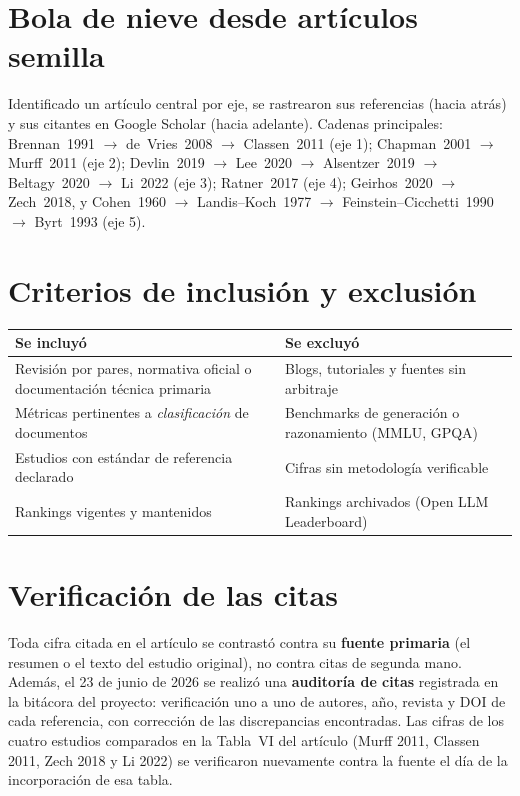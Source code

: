 \documentclass[11pt,a4paper]{article}
\begin{document}
\section{Bola de nieve desde artículos semilla}

Identificado un artículo central por eje, se rastrearon sus referencias
(hacia atrás) y sus citantes en Google Scholar (hacia adelante). Cadenas
principales: Brennan~1991 $\rightarrow$ de~Vries~2008 $\rightarrow$
Classen~2011 (eje 1); Chapman~2001 $\rightarrow$ Murff~2011 (eje 2);
Devlin~2019 $\rightarrow$ Lee~2020 $\rightarrow$ Alsentzer~2019
$\rightarrow$ Beltagy~2020 $\rightarrow$ Li~2022 (eje 3); Ratner~2017 (eje
4); Geirhos~2020 $\rightarrow$ Zech~2018, y Cohen~1960 $\rightarrow$
Landis--Koch~1977 $\rightarrow$ Feinstein--Cicchetti~1990 $\rightarrow$
Byrt~1993 (eje 5).

\section{Criterios de inclusión y exclusión}

\begin{center}
\begin{tabular}{@{}p{7.0cm}p{7.0cm}@{}}
\toprule
\textbf{Se incluyó} & \textbf{Se excluyó} \\
\midrule
Revisión por pares, normativa oficial o documentación técnica primaria &
Blogs, tutoriales y fuentes sin arbitraje \\
Métricas pertinentes a \emph{clasificación} de documentos &
Benchmarks de generación o razonamiento (MMLU, GPQA) \\
Estudios con estándar de referencia declarado &
Cifras sin metodología verificable \\
Rankings vigentes y mantenidos &
Rankings archivados (Open LLM Leaderboard) \\
\bottomrule
\end{tabular}
\end{center}

\section{Verificación de las citas}

Toda cifra citada en el artículo se contrastó contra su \textbf{fuente
primaria} (el resumen o el texto del estudio original), no contra citas de
segunda mano. Además, el 23 de junio de 2026 se realizó una
\textbf{auditoría de citas} registrada en la bitácora del proyecto:
verificación uno a uno de autores, año, revista y DOI de cada referencia,
con corrección de las discrepancias encontradas. Las cifras de los cuatro
estudios comparados en la Tabla~VI del artículo (Murff 2011, Classen 2011,
Zech 2018 y Li 2022) se verificaron nuevamente contra la fuente el día de la
incorporación de esa tabla.
\end{document}
